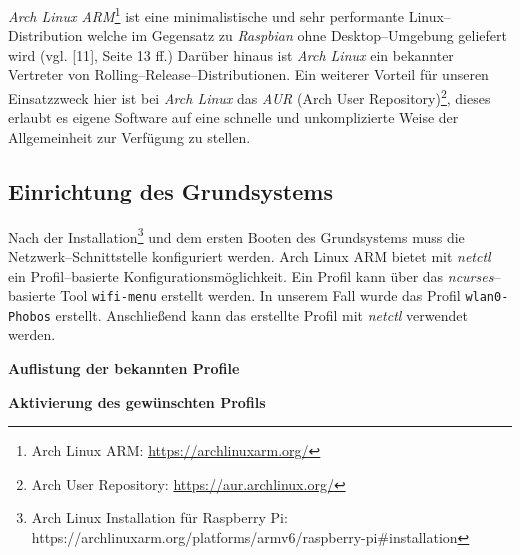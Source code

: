 \documentclass[11pt,ngerman,toc=listof,index=totoc]{scrreprt}
\newenvironment{Shaded}{}{}
\newcommand{\KeywordTok}[1]{\textcolor[rgb]{0.00,0.44,0.13}{\textbf{{#1}}}}
\newcommand{\CommentTok}[1]{\textcolor[rgb]{0.38,0.63,0.69}{\textit{{#1}}}}
\newcommand{\NormalTok}[1]{{#1}}
\begin{document}
\emph{Arch Linux ARM}\footnote{Arch Linux ARM:
  \url{https://archlinuxarm.org/}} ist eine minimalistische und sehr
performante Linux--Distribution welche im Gegensatz zu \emph{Raspbian}
ohne Desktop--Umgebung geliefert wird (vgl. {[}11{]}, Seite 13 ff.)
Darüber hinaus ist \emph{Arch Linux} ein bekannter Vertreter von
Rolling--Release--Distributionen. Ein weiterer Vorteil für unseren
Einsatzzweck hier ist bei \emph{Arch Linux} das \emph{AUR} (Arch User
Repository)\footnote{Arch User Repository:
  \url{https://aur.archlinux.org/}}, dieses erlaubt es eigene Software
auf eine schnelle und unkomplizierte Weise der Allgemeinheit zur
Verfügung zu stellen.

\subsection{Einrichtung des
Grundsystems}\label{einrichtung-des-grundsystems}

Nach der Installation\footnote{Arch Linux Installation für Raspberry Pi:
  https://archlinuxarm.org/platforms/armv6/raspberry-pi\#installation}
und dem ersten Booten des Grundsystems muss die Netzwerk--Schnittstelle
konfiguriert werden. Arch Linux ARM bietet mit \emph{netctl} ein
Profil--basierte Konfigurationsmöglichkeit. Ein Profil kann über das
\emph{ncurses}--basierte Tool \texttt{wifi-menu} erstellt werden. In
unserem Fall wurde das Profil \texttt{wlan0-Phobos} erstellt.
Anschließend kann das erstellte Profil mit \emph{netctl} verwendet
werden.

\textbf{Auflistung der bekannten Profile}

\begin{Shaded}
\end{Shaded}

\textbf{Aktivierung des gewünschten Profils}

\begin{Shaded}
\end{Shaded}
\end{document}
